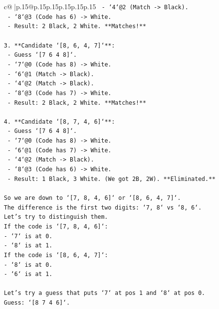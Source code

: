 \documentclass{article}
\begin{document}
{\begin{supertabular}{c@{$\;$}|p{.15\linewidth}@{}p{.15\linewidth}p{.15\linewidth}p{.15\linewidth}p{.15\linewidth}p{.15\linewidth}}
{{{\texttt{    {-} `4`@2 (Match {-}> Black).} \\
\texttt{    {-} `8`@3 (Code has 6) {-}> White.} \\
\texttt{    {-} Result: 2 Black, 2 White. **Matches!**} \\
\\ 
\texttt{3.  **Candidate `{[}8, 6, 4, 7{]}`**:} \\
\texttt{    {-} Guess `{[}7 6 4 8{]}`.} \\
\texttt{    {-} `7`@0 (Code has 8) {-}> White.} \\
\texttt{    {-} `6`@1 (Match {-}> Black).} \\
\texttt{    {-} `4`@2 (Match {-}> Black).} \\
\texttt{    {-} `8`@3 (Code has 7) {-}> White.} \\
\texttt{    {-} Result: 2 Black, 2 White. **Matches!**} \\
\\ 
\texttt{4.  **Candidate `{[}8, 7, 4, 6{]}`**:} \\
\texttt{    {-} Guess `{[}7 6 4 8{]}`.} \\
\texttt{    {-} `7`@0 (Code has 8) {-}> White.} \\
\texttt{    {-} `6`@1 (Code has 7) {-}> White.} \\
\texttt{    {-} `4`@2 (Match {-}> Black).} \\
\texttt{    {-} `8`@3 (Code has 6) {-}> White.} \\
\texttt{    {-} Result: 1 Black, 3 White. (We got 2B, 2W). **Eliminated.**} \\
\\ 
\texttt{So we are down to `{[}7, 8, 4, 6{]}` or `{[}8, 6, 4, 7{]}`.} \\
\texttt{The difference is the first two digits: `7, 8` vs `8, 6`.} \\
\texttt{Let's try to distinguish them.} \\
\texttt{If the code is `{[}7, 8, 4, 6{]}`:} \\
\texttt{{-} `7` is at 0.} \\
\texttt{{-} `8` is at 1.} \\
\texttt{If the code is `{[}8, 6, 4, 7{]}`:} \\
\texttt{{-} `8` is at 0.} \\
\texttt{{-} `6` is at 1.} \\
\\ 
\texttt{Let's try a guess that puts `7` at pos 1 and `8` at pos 0.} \\
\texttt{Guess: `{[}8 7 4 6{]}`.} \\
}}}
\end{supertabular}}
\end{document}
